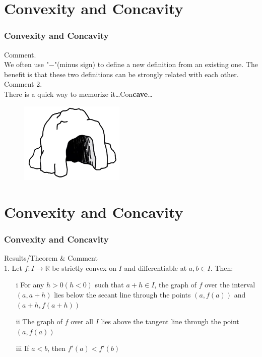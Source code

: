 \documentclass[12pt, t]{beamer}
\begin{document}
\section{Convexity and Concavity}
\begin{frame}
    \frametitle{Convexity and Concavity}
Comment. \\
\vspace{0.5em}
\hspace{1em}
We often use "$-$"(minus sign) to define a new definition from an existing one. The benefit is that these two definitions can 
be strongly related with each other.\\
\vspace{1em}
Comment 2.\\
\hspace{1em}
There is a quick way to memorize it\dots\hspace{2em}Con\textbf{cave}\dots
\begin{figure}[H]
    \centering
    \includegraphics[width=5cm]{Figures/Concave.png}
\end{figure}

\end{frame}

\section{Convexity and Concavity}
\begin{frame}
    \frametitle{Convexity and Concavity}
Results/Theorem \& Comment\\
\vspace{1em}
1. Let $f:I\rightarrow\mathbb{R}$ be strictly convex on $I$ and differentiable at $a,b\in I$. Then:
\begin{enumerate}
    \item[i] For any $h>0(h<0)$ such that $a+h\in I$, the graph of $f$ over the interval $(a,a+h)$ lies below the secant line through the 
        points $(a,f(a))$ and $(a+h, f(a+h))$
    \item[ii] The graph of $f$ over all $I$ lies above the tangent line through the point $(a, f(a))$
    \item[iii] If $a<b$, then $f'(a)<f'(b)$
\end{enumerate}


\end{frame}
\end{document}

